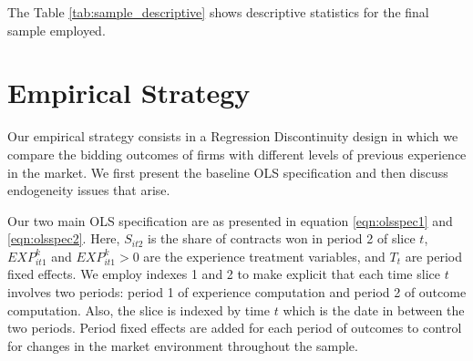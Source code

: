

The Table \ref{tab:sample_descriptive} shows descriptive statistics for the final sample employed.



\section{Empirical Strategy}
Our empirical strategy consists in a Regression Discontinuity design in which we compare the bidding outcomes of firms with different levels of previous experience in the market. We first present the baseline OLS specification and then discuss endogeneity issues that arise.

Our two main OLS specification are as presented in equation \ref{eqn:olsspec1} and \ref{eqn:olsspec2}. Here, $S_{it2}$ is the share of contracts won in period 2 of slice $t$, $EXP^k_{it1}$ and $EXP^k_{it1}>0$ are the experience treatment variables, and $T_t$ are period fixed effects. We employ indexes 1 and 2 to make explicit that each time slice $t$ involves two periods: period 1 of experience computation and period 2 of outcome computation. Also, the slice is indexed by time $t$ which is the date in between the two periods. Period fixed effects are added for each period of outcomes to control for changes in the market environment throughout the sample.

